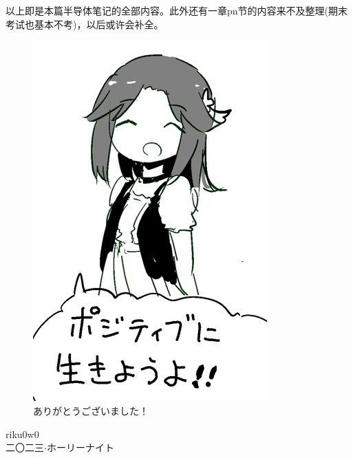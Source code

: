\chapter*{ }

以上即是本篇半导体笔记的全部内容。此外还有一章pn节的内容来不及整理(期末考试也基本不考)，以后或许会补全。

\begin{figure}[ht]
    \centering
    \includegraphics[width=0.7\linewidth]{teru2.png}
    \caption*{\mincho ありがとうございました！}
    \label{fig:teru2}
\end{figure}

\begin{flushright}
	riku0w0 \\
	\mincho 二〇二三$\cdot$ホーリーナイト\\
\end{flushright}



